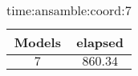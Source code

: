 \begin{table}[!ht]
	\centering
	\begin{tabular}{|c|c|}
		\hline
		Models & elapsed \\ \hline
		$7$ & $860.34$ \\ \hline
	\end{tabular}
	\caption{time:ansamble:coord:7}
	\label{tab:time:ansamble:coord:7}
\end{table}
